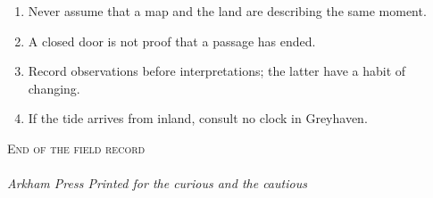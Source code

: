 \begin{enumerate}
  \item Never assume that a map and the land are describing the same moment.
  \item A closed door is not proof that a passage has ended.
  \item Record observations before interpretations; the latter have a habit of changing.
  \item If the tide arrives from inland, consult no clock in Greyhaven.
\end{enumerate}

\vfill
\begin{center}
  \textsc{End of the field record}\\[1em]
  \PulpBarcode\\[1em]
  \textit{Arkham Press \textbullet{} Printed for the curious and the cautious}
\end{center}
\clearpage
